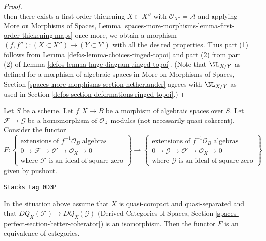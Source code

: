 \begin{proof}
$$$$
then there exists a first order thickening $X \subset X''$
with $\mathcal{O}_{X''} = \mathcal{A}$ and applying
More on Morphisms of Spaces, Lemma
\ref{spaces-more-morphisms-lemma-first-order-thickening-maps}
once more, we obtain a morphism
$(f, f'') : (X \subset X'') \to (Y \subset Y')$ with all the
desired properties.
Thus part (1) follows from
Lemma \ref{defos-lemma-choices-ringed-topoi}
and part (2) from part (2) of
Lemma \ref{defos-lemma-huge-diagram-ringed-topoi}.
(Note that $\NL_{X/Y}$ as defined for a morphism of algebraic spaces in
More on Morphisms of Spaces, Section
\ref{spaces-more-morphisms-section-netherlander}
agrees with $\NL_{X/Y}$ as used in
Section \ref{defos-section-deformations-ringed-topoi}.)
\end{proof}

Let $S$ be a scheme. Let $f : X \to B$
be a morphism of algebraic spaces over $S$.
Let $\mathcal{F} \to \mathcal{G}$ be a homomorphism of $\mathcal{O}_X$-modules
(not necessarily quasi-coherent).
Consider the functor
$$
F :
\left\{
\begin{matrix}
\text{extensions of }f^{-1}\mathcal{O}_B\text{ algebras}\\
0 \to \mathcal{F} \to \mathcal{O}' \to \mathcal{O}_X \to 0\\
\text{where }\mathcal{F}\text{ is an ideal of square zero}
\end{matrix}
\right\}
\longrightarrow
\left\{
\begin{matrix}
\text{extensions of }f^{-1}\mathcal{O}_B\text{ algebras}\\
0 \to \mathcal{G} \to \mathcal{O}' \to \mathcal{O}_X \to 0\\
\text{where }\mathcal{G}\text{ is an ideal of square zero}
\end{matrix}
\right\}
$$
given by pushout.

\begin{lemma}
\label{defos-lemma-thickening-space-quasi-coherent}
\href{https://stacks.math.columbia.edu/tag/0D3P}{\texttt{Stacks tag 0D3P}}

In the situation above assume that $X$ is quasi-compact and quasi-separated
and that $DQ_X(\mathcal{F}) \to DQ_X(\mathcal{G})$
(Derived Categories of Spaces, Section
\ref{spaces-perfect-section-better-coherator})
is an isomorphism. Then the functor $F$ is an equivalence of categories.
\end{lemma}

